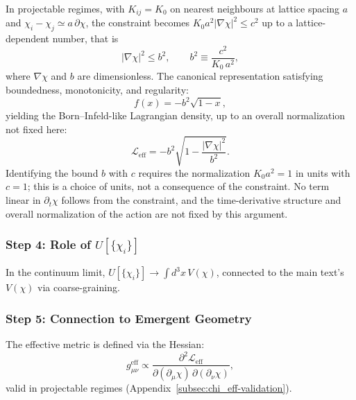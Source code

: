     In projectable regimes, with $K_{ij} = K_0$ on nearest neighbours at lattice spacing $a$ and
    $\chi_i - \chi_j \simeq a\,\partial\chi$, the constraint becomes $K_0 a^2 |\nabla\chi|^2 \le c^2$ up to a
    lattice-dependent number, that is
    \begin{equation}
      |\nabla\chi|^2 \le b^2,
      \qquad
      b^2 \equiv \frac{c^2}{K_0\,a^2},
      \label{eq:A12-continuum-bound_v171}
    \end{equation}
    where $\nabla\chi$ and $b$ are dimensionless.
    The canonical representation satisfying boundedness, monotonicity, and
    regularity:
    \begin{equation}
      f(x) = -b^2\sqrt{1 - x},
      \label{eq:A12-born-infeld-derivation_v171}
    \end{equation}
    yielding the Born--Infeld-like Lagrangian density, up to an overall normalization not fixed here:
    \begin{equation}
      \mathcal{L}_{\text{eff}}
      = -b^2\sqrt{
        1 - \frac{|\nabla\chi|^2}{b^2}
      }.
      \label{eq:A12-effective-lagrangian_v171}
    \end{equation}
    Identifying the bound $b$ with $c$ requires the normalization $K_0 a^2 = 1$ in units with $c = 1$; this is a
    choice of units, not a consequence of the constraint.
    No term linear in $\partial_t\chi$ follows from the constraint, and the time-derivative structure and overall
    normalization of the action are not fixed by this argument.

  \subsubsection*{Step 4: Role of $U[\{\chi_i\}]$}
    \label{subsec:A12-potential-role_v171}

    In the continuum limit,
    $U[\{\chi_i\}] \to \int d^3x\,V(\chi)$,
    connected to the main text's $V(\chi)$ via coarse-graining.

  \subsubsection*{Step 5: Connection to Emergent Geometry}
    \label{subsec:A12-emergent-geometry_v171}

    The effective metric is defined via the Hessian:
    \begin{equation}
      g_{\mu\nu}^{\text{eff}}
      \propto
      \frac{\partial^2\mathcal{L}_{\text{eff}}}
      {\partial(\partial_\mu\chi)\,
      \partial(\partial_\nu\chi)},
      \label{eq:A12-emergent-metric_v171}
    \end{equation}
    valid in projectable regimes
    (Appendix~\ref{subsec:chi_eff-validation}).


